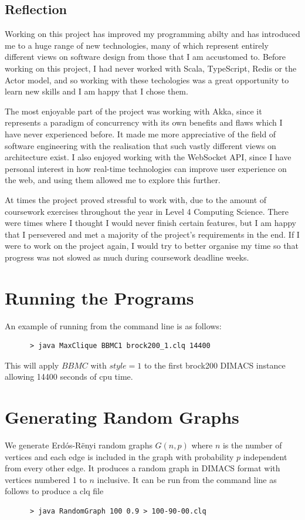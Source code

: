 \documentclass{l4proj}
\begin{document}
    \section{Reflection}
    Working on this project has improved my programming abilty and has introduced me to a huge range of new technologies, many of which represent entirely different views on software design from those that I am accustomed to. Before working on this project, I had never worked with Scala, TypeScript, Redis or the Actor model, and so working with these techologies was a great opportunity to learn new skills and I am happy that I chose them.
    
    The most enjoyable part of the project was working with Akka, since it represents a paradigm of concurrency with its own benefits and flaws which I have never experienced before. It made me more appreciative of the field of software engineering with the realisation that such vastly different views on architecture exist. I also enjoyed working with the WebSocket API, since I have personal interest in how real-time technologies can improve user experience on the web, and using them allowed me to explore this further.
    
    At times the project proved stressful to work with, due to the amount of coursework exercises throughout the year in Level 4 Computing Science. There were times where I thought I would never finish certain features, but I am happy that I persevered and met a majority of the project's requirements in the end. If I were to work on the project again, I would try to better organise my time so that progress was not slowed as much during coursework deadline weeks.

\begin{appendices}

\chapter{Running the Programs}
An example of running from the command line is as follows:
\begin{verbatim}
      > java MaxClique BBMC1 brock200_1.clq 14400
\end{verbatim}
This will apply $BBMC$ with $style = 1$ to the first brock200 DIMACS instance allowing 14400 seconds of cpu time.

\chapter{Generating Random Graphs}
\label{sec:randomGraph}
We generate Erd\'{o}s-R\"{e}nyi random graphs $G(n,p)$ where $n$ is the number of vertices and
each edge is included in the graph with probability $p$ independent from every other edge. It produces
a random graph in DIMACS format with vertices numbered 1 to $n$ inclusive. It can be run from the command line as follows to produce 
a clq file
\begin{verbatim}
      > java RandomGraph 100 0.9 > 100-90-00.clq
\end{verbatim}
\end{appendices}



\end{document}
